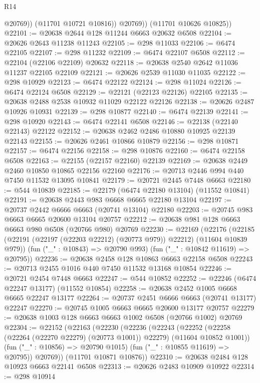\begin{lexlean}{R14}
\begin{coremodule}
{{{{{{{{{{{{{{{{{{{{{{{{{{{{{{{{{{{{{{{{{{{{{{{{{{{{{{{{{{{{{{{{{{{{{{{{{{{{{{{{{{                @20769))
            (@11701 @10721 @10816))
          @20769))
      (@11701 @10626 @10825))
@22101 := @20638 @2644 @128 @11244 @6663 @20632 @6508
@22104 := @20626 @2643 @11238 @11243
@22105 := @298 @11033
@22106 := @6474 @22105
@22107 := @298 @11232
@22109 := @6474 @22107 @6508
@22112 := @22104 (@22106 @22109) @20632
@22118 := @20638 @2540 @2642 @11036 @11237 @22105 @22109
@22121 := @20626 @2539 @11030 @11035
@22122 := @298 @10929
@22123 := @6474 @22122
@22124 := @298 @11024
@22126 := @6474 @22124 @6508
@22129 := @22121 (@22123 @22126) @22105
@22135 := @20638 @2488 @2538 @10932 @11029 @22122 @22126
@22138 := @20626 @2487 @10926 @10931
@22139 := @298 @10877
@22140 := @6474 @22139
@22141 := @298 @10920
@22143 := @6474 @22141 @6508
@22146 := @22138 (@22140 @22143) @22122
@22152 := @20638 @2462 @2486 @10880 @10925 @22139 @22143
@22155 := @20626 @2461 @10866 @10879
@22156 := @298 @10871
@22157 := @6474 @22156
@22158 := @298 @10876
@22160 := @6474 @22158 @6508
@22163 := @22155 (@22157 @22160) @22139
@22169 := @20638 @2449 @2460 @10850 @10865 @22156 @22160
@22176 := @20713 @2446 @994 @440 @7450 @11532 @13095 @10841
@22179 := @20721 @2445 @7448 @6663
@22180 := @544 @10839
@22185 := @22179 (@6474 @22180 @13104) (@11552 @10841)
@22191 := @20638 @2443 @983 @6668 @6665 @22180 @13104
@22197 := @20737 @2442 @6666 @6663 (@20741 @13104) @22180
@22203 := @20745 @983 @6663 @6665 @20600 @13104 @20757
@22212 := @20638 @981 @128 @6663 @6663 @980 @6508 (@20766 @980) @20769
@22230 := @22169
    (@22176
      (@22185 (@22191 (@22197 (@22203 @22212) (@20773 @979)) @22212) (@11604 @10839 @979))
      (fun ("_" : @10843) => @20790 @993)
      (fun ("_" : @10842 @11619) => @20795))
@22236 := @20638 @2458 @128 @10863 @6663 @22158 @6508
@22243 := @20713 @2455 @1016 @440 @7450 @11532 @13168 @10854
@22246 := @20721 @2454 @7448 @6663
@22247 := @544 @10852
@22252 := @22246 (@6474 @22247 @13177) (@11552 @10854)
@22258 := @20638 @2452 @1005 @6668 @6665 @22247 @13177
@22264 := @20737 @2451 @6666 @6663 (@20741 @13177) @22247
@22270 := @20745 @1005 @6663 @6665 @20600 @13177 @20757
@22279 := @20638 @1003 @128 @6663 @6663 @1002 @6508 (@20766 @1002) @20769
@22304 := @22152
    (@22163
      (@22230
        (@22236
          (@22243
            (@22252 (@22258 (@22264 (@22270 @22279) (@20773 @1001)) @22279) (@11604 @10852 @1001))
            (fun ("_" : @10856) => @20790 @1015)
            (fun ("_" : @10855 @11619) => @20795))
          @20769))
      (@11701 @10871 @10876))
@22310 := @20638 @2484 @128 @10923 @6663 @22141 @6508
@22313 := @20626 @2483 @10909 @10922
@22314 := @298 @10914
}}}}}}}}}}}}}}}}}}}}}}}}}}}}}}}}}}}}}}}}}}}}}}}}}}}}}}}}}}}}}}}}}}}}}}}}}}}}}}}}}}
\end{coremodule}
\end{lexlean}
